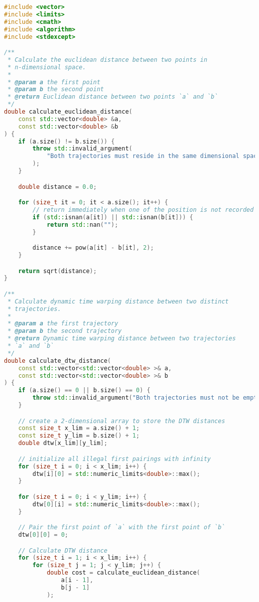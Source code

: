 \begin{lstlisting}[language=C++, caption=Implementasi 
modul \texttt{spatial.cpp},label={lamp:module-spatial}]
#include <vector>
#include <limits>
#include <cmath>
#include <algorithm>
#include <stdexcept>

/**
 * Calculate the euclidean distance between two points in
 * n-dimensional space.
 * 
 * @param a the first point
 * @param b the second point
 * @return Euclidean distance between two points `a` and `b`
 */
double calculate_euclidean_distance(
    const std::vector<double> &a,
    const std::vector<double> &b
) {
    if (a.size() != b.size()) {
        throw std::invalid_argument(
            "Both trajectories must reside in the same dimensional space."
        );
    }

    double distance = 0.0;

    for (size_t it = 0; it < a.size(); it++) {
        // return immediately when one of the position is not recorded
        if (std::isnan(a[it]) || std::isnan(b[it])) {
            return std::nan("");
        }

        distance += pow(a[it] - b[it], 2);
    }

    return sqrt(distance);
}

/**
 * Calculate dynamic time warping distance between two distinct
 * trajectories.
 * 
 * @param a the first trajectory
 * @param b the second trajectory
 * @return Dynamic time warping distance between two trajectories
 * `a` and `b`
 */
double calculate_dtw_distance(
    const std::vector<std::vector<double> >& a,
    const std::vector<std::vector<double> >& b
) {
    if (a.size() == 0 || b.size() == 0) {
        throw std::invalid_argument("Both trajectories must not be empty.");
    }

    // create a 2-dimensional array to store the DTW distances
    const size_t x_lim = a.size() + 1;
    const size_t y_lim = b.size() + 1;
    double dtw[x_lim][y_lim];

    // initialize all illegal first pairings with infinity
    for (size_t i = 0; i < x_lim; i++) {
        dtw[i][0] = std::numeric_limits<double>::max();        
    }

    for (size_t i = 0; i < y_lim; i++) {
        dtw[0][i] = std::numeric_limits<double>::max();
    }

    // Pair the first point of `a` with the first point of `b`
    dtw[0][0] = 0;

    // Calculate DTW distance
    for (size_t i = 1; i < x_lim; i++) {
        for (size_t j = 1; j < y_lim; j++) {
            double cost = calculate_euclidean_distance(
                a[i - 1],
                b[j - 1]
            );


\end{lstlisting}
